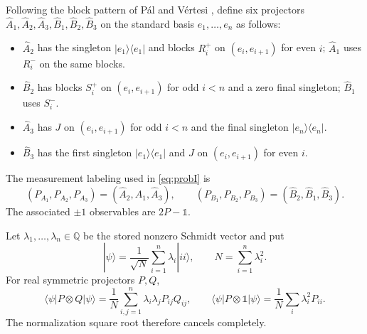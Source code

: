 \documentclass[11pt]{article}
\newcommand{\1}{\mathbb{1}}
\newcommand{\Q}{\mathbb{Q}}
\begin{document}
Following the block pattern of P\'al and V\'ertesi \cite{PalVertesi2010}, define six projectors $\widehat A_1,\widehat A_2,\widehat A_3,\widehat B_1,\widehat B_2,\widehat B_3$ on the standard basis $e_1,\ldots,e_n$ as follows:
\begin{itemize}
\item $\widehat A_2$ has the singleton $|e_1\rangle\langle e_1|$ and blocks $R_i^+$ on $(e_i,e_{i+1})$ for even $i$; $\widehat A_1$ uses $R_i^-$ on the same blocks.
\item $\widehat B_2$ has blocks $S_i^+$ on $(e_i,e_{i+1})$ for odd $i<n$ and a zero final singleton; $\widehat B_1$ uses $S_i^-$.
\item $\widehat A_3$ has $J$ on $(e_i,e_{i+1})$ for odd $i<n$ and the final singleton $|e_n\rangle\langle e_n|$.
\item $\widehat B_3$ has the first singleton $|e_1\rangle\langle e_1|$ and $J$ on $(e_i,e_{i+1})$ for even $i$.
\end{itemize}
The measurement labeling used in \eqref{eq:probI} is
\begin{equation}\label{eq:relabel}
(P_{A_1},P_{A_2},P_{A_3})=(\widehat A_2,\widehat A_1,\widehat A_3),
\qquad
(P_{B_1},P_{B_2},P_{B_3})=(\widehat B_2,\widehat B_1,\widehat B_3).
\end{equation}
The associated $\pm1$ observables are $2P-\1$.

Let $\lambda_1,\ldots,\lambda_n\in\Q$ be the stored nonzero Schmidt vector and put
\[
|\psi\rangle=\frac{1}{\sqrt{N}}\sum_{i=1}^n\lambda_i|ii\rangle,
\qquad N=\sum_{i=1}^n\lambda_i^2.
\]
For real symmetric projectors $P,Q$,
\begin{equation}\label{eq:diagstate}
\langle\psi|P\otimes Q|\psi\rangle
=\frac1N\sum_{i,j=1}^n\lambda_i\lambda_jP_{ij}Q_{ij},
\qquad
\langle\psi|P\otimes\1|\psi\rangle
=\frac1N\sum_i\lambda_i^2P_{ii}.
\end{equation}
The normalization square root therefore cancels completely.
\end{document}
